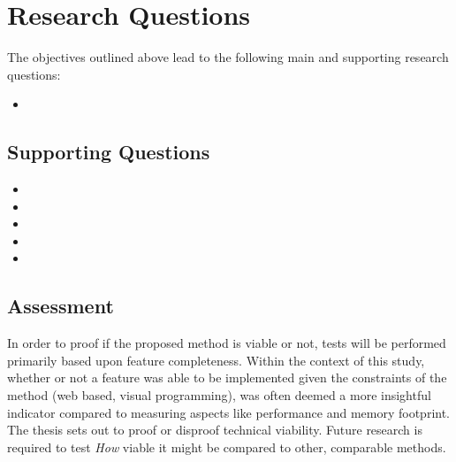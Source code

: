 

\section{Research Questions}
The objectives outlined above lead to the following main and supporting research questions:  
\begin{itemize}[ ]
  \item \myNewMainRQ
\end{itemize}

\subsection*{Supporting Questions}

\begin{itemize}[-]
\item \myNewSubRQOne
\item \myNewSubRQTwo
\item \myNewSubRQThree
\item \myNewSubRQFour
\item \myNewSubRQFive
\end{itemize}

\subsection*{Assessment}
In order to proof if the proposed method is viable or not, tests will be performed primarily based upon feature completeness.
Within the context of this study, whether or not a feature was able to be implemented given the constraints of the method (web based, visual programming), was often deemed a more insightful indicator compared to measuring aspects like performance and memory footprint.
The thesis sets out to proof or disproof technical viability. 
Future research is required to test \emph{How} viable it might be compared to other, comparable methods.

